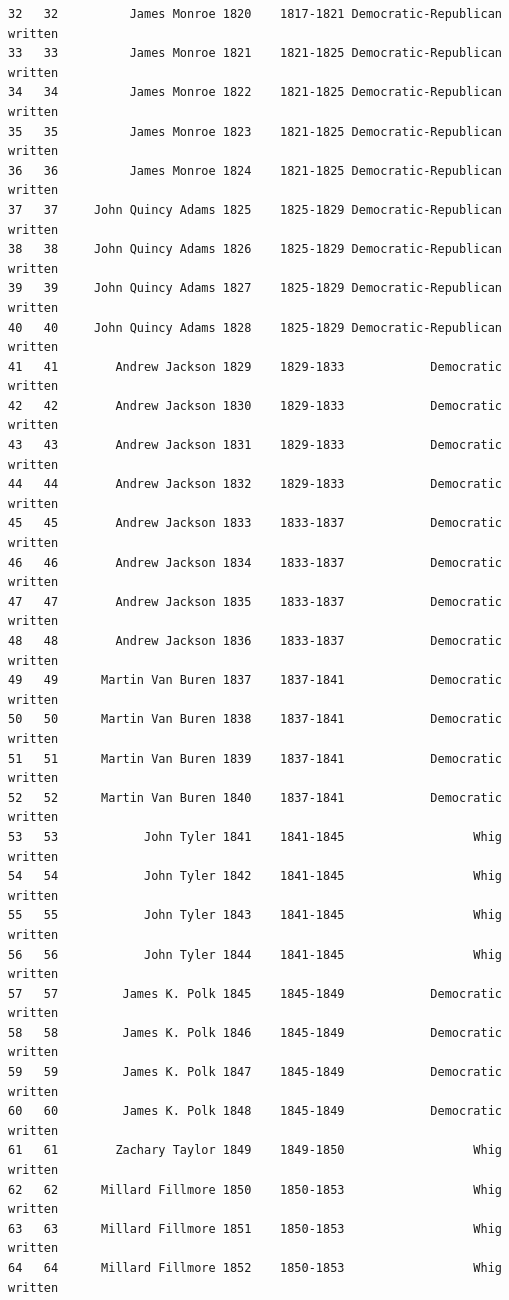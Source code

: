 \documentclass[
  letterpaper,
  DIV=11,
  numbers=noendperiod]{scrreprt}
\begin{document}
\begin{verbatim}
32   32          James Monroe 1820    1817-1821 Democratic-Republican   written
33   33          James Monroe 1821    1821-1825 Democratic-Republican   written
34   34          James Monroe 1822    1821-1825 Democratic-Republican   written
35   35          James Monroe 1823    1821-1825 Democratic-Republican   written
36   36          James Monroe 1824    1821-1825 Democratic-Republican   written
37   37     John Quincy Adams 1825    1825-1829 Democratic-Republican   written
38   38     John Quincy Adams 1826    1825-1829 Democratic-Republican   written
39   39     John Quincy Adams 1827    1825-1829 Democratic-Republican   written
40   40     John Quincy Adams 1828    1825-1829 Democratic-Republican   written
41   41        Andrew Jackson 1829    1829-1833            Democratic   written
42   42        Andrew Jackson 1830    1829-1833            Democratic   written
43   43        Andrew Jackson 1831    1829-1833            Democratic   written
44   44        Andrew Jackson 1832    1829-1833            Democratic   written
45   45        Andrew Jackson 1833    1833-1837            Democratic   written
46   46        Andrew Jackson 1834    1833-1837            Democratic   written
47   47        Andrew Jackson 1835    1833-1837            Democratic   written
48   48        Andrew Jackson 1836    1833-1837            Democratic   written
49   49      Martin Van Buren 1837    1837-1841            Democratic   written
50   50      Martin Van Buren 1838    1837-1841            Democratic   written
51   51      Martin Van Buren 1839    1837-1841            Democratic   written
52   52      Martin Van Buren 1840    1837-1841            Democratic   written
53   53            John Tyler 1841    1841-1845                  Whig   written
54   54            John Tyler 1842    1841-1845                  Whig   written
55   55            John Tyler 1843    1841-1845                  Whig   written
56   56            John Tyler 1844    1841-1845                  Whig   written
57   57         James K. Polk 1845    1845-1849            Democratic   written
58   58         James K. Polk 1846    1845-1849            Democratic   written
59   59         James K. Polk 1847    1845-1849            Democratic   written
60   60         James K. Polk 1848    1845-1849            Democratic   written
61   61        Zachary Taylor 1849    1849-1850                  Whig   written
62   62      Millard Fillmore 1850    1850-1853                  Whig   written
63   63      Millard Fillmore 1851    1850-1853                  Whig   written
64   64      Millard Fillmore 1852    1850-1853                  Whig   written

\end{verbatim}
\end{document}
